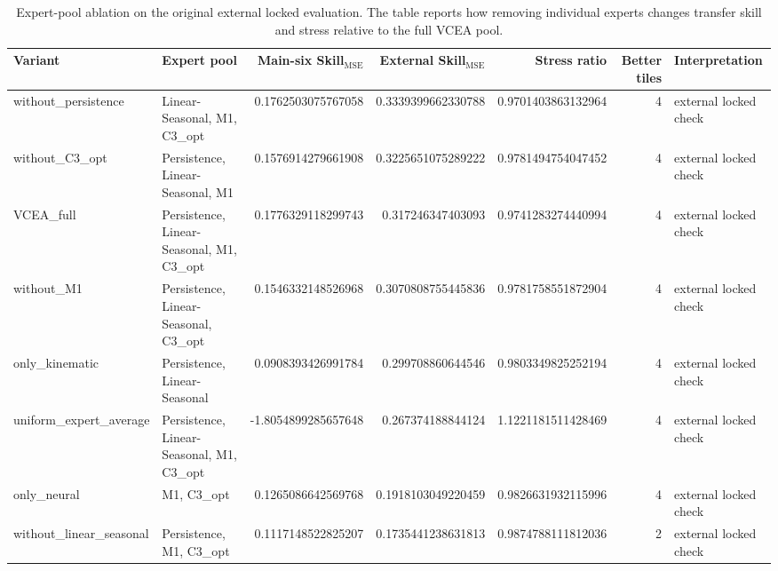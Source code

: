 \begin{table}[t]
\centering
\scriptsize
\begin{adjustbox}{max width=\textwidth}
\begin{tabular}{llrrrrp{}}
\toprule
Variant & Expert pool & Main-six Skill$_{\mathrm{MSE}}$ & External Skill$_{\mathrm{MSE}}$ & Stress ratio & Better tiles & Interpretation \\
\midrule
without\_persistence & Linear-Seasonal, M1, C3\_opt & 0.1762503075767058 & 0.3339399662330788 & 0.9701403863132964 & 4 & external locked check \\
without\_C3\_opt & Persistence, Linear-Seasonal, M1 & 0.1576914279661908 & 0.3225651075289222 & 0.9781494754047452 & 4 & external locked check \\
VCEA\_full & Persistence, Linear-Seasonal, M1, C3\_opt & 0.1776329118299743 & 0.317246347403093 & 0.9741283274440994 & 4 & external locked check \\
without\_M1 & Persistence, Linear-Seasonal, C3\_opt & 0.1546332148526968 & 0.3070808755445836 & 0.9781758551872904 & 4 & external locked check \\
only\_kinematic & Persistence, Linear-Seasonal & 0.0908393426991784 & 0.299708860644546 & 0.9803349825252194 & 4 & external locked check \\
uniform\_expert\_average & Persistence, Linear-Seasonal, M1, C3\_opt & -1.8054899285657648 & 0.267374188844124 & 1.1221181511428469 & 4 & external locked check \\
only\_neural & M1, C3\_opt & 0.1265086642569768 & 0.1918103049220459 & 0.9826631932115996 & 4 & external locked check \\
without\_linear\_seasonal & Persistence, M1, C3\_opt & 0.1117148522825207 & 0.1735441238631813 & 0.9874788111812036 & 2 & external locked check \\
\bottomrule
\end{tabular}
\end{adjustbox}
\caption{Expert-pool ablation on the original external locked evaluation. The table reports how removing individual experts changes transfer skill and stress relative to the full VCEA pool.}
\label{tab:e2_expert_ablation_external}
\end{table}

